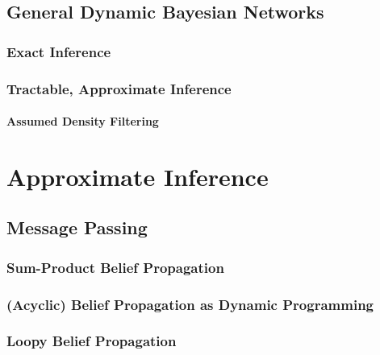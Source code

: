 	\section{General Dynamic Bayesian Networks} %

		\subsection{Exact Inference} %

		\subsection{Tractable, Approximate Inference} %

			\subsubsection{Assumed Density Filtering} %

\chapter{Approximate Inference} %

	\section{Message Passing} %

		\subsection{Sum-Product Belief Propagation} %

		\subsection{(Acyclic) Belief Propagation as Dynamic Programming} %

		\subsection{Loopy Belief Propagation} %


